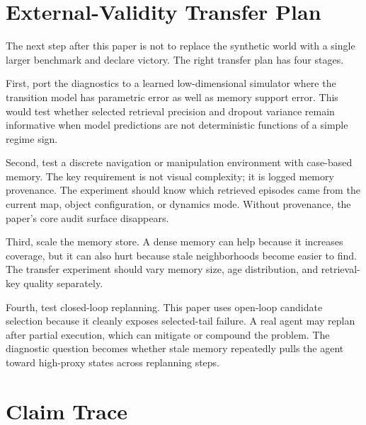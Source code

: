 \documentclass{article}
\begin{document}
\section{External-Validity Transfer Plan}
\label{app:transfer-plan}

The next step after this paper is not to replace the synthetic world with a
single larger benchmark and declare victory. The right transfer plan has four
stages.

First, port the diagnostics to a learned low-dimensional simulator where the
transition model has parametric error as well as memory support error. This
would test whether selected retrieval precision and dropout variance remain
informative when model predictions are not deterministic functions of a simple
regime sign.

Second, test a discrete navigation or manipulation environment with
case-based memory. The key requirement is not visual complexity; it is logged
memory provenance. The experiment should know which retrieved episodes came
from the current map, object configuration, or dynamics mode. Without
provenance, the paper's core audit surface disappears.

Third, scale the memory store. A dense memory can help because it increases
coverage, but it can also hurt because stale neighborhoods become easier to
find. The transfer experiment should vary memory size, age distribution, and
retrieval-key quality separately.

Fourth, test closed-loop replanning. This paper uses open-loop candidate
selection because it cleanly exposes selected-tail failure. A real agent may
replan after partial execution, which can mitigate or compound the problem.
The diagnostic question becomes whether stale memory repeatedly pulls the
agent toward high-proxy states across replanning steps.

\section{Claim Trace}
\label{app:claim-trace}
\end{document}
